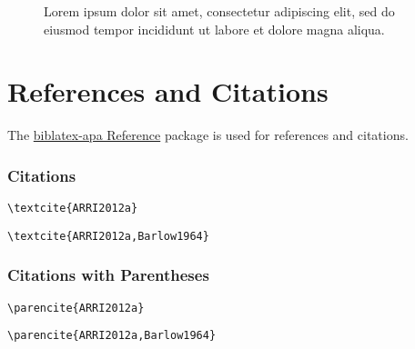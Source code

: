 \begin{figure}
    
    \caption{
        Lorem ipsum dolor sit amet, consectetur adipiscing elit,
        sed do eiusmod tempor incididunt ut labore et dolore magna aliqua.
    }
\end{figure}

\section{References and Citations}

The \href{https://ctan.org/pkg/biblatex-apa}{biblatex-apa Reference}
package is used for references and citations.

\subsubsection{Citations}

\begin{lstlisting}[caption=Citation for Single Author.]
\textcite{ARRI2012a}
\end{lstlisting}

\textcite{ARRI2012a}

\begin{lstlisting}[caption=Citation for Multiple Authors.]
\textcite{ARRI2012a,Barlow1964}
\end{lstlisting}

\textcite{ARRI2012a,Barlow1964}

\subsubsection{Citations with Parentheses}

\begin{lstlisting}[caption=Citation with Parentheses for Single Author.]
\parencite{ARRI2012a}
\end{lstlisting}

\parencite{ARRI2012a}

\begin{lstlisting}[caption=Citation with Parentheses for Multiple Authors.]
\parencite{ARRI2012a,Barlow1964}
\end{lstlisting}

\parencite{ARRI2012a,Barlow1964}
